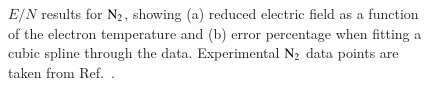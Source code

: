 \begin{figure}[!htbp]
\caption{$E/N$ results for $\rm N_2$, showing (a) reduced electric field as a function of the electron temperature and (b) error percentage when fitting a cubic spline through the data. Experimental $\rm N_2$ data points are taken from Ref.\ .}
\label{fig:electronimpact_1}
\end{figure}
%
